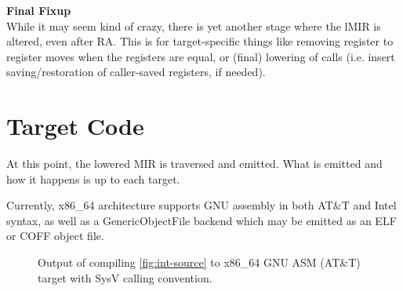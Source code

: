 \documentclass[12pt]{article}
\begin{document}
\noindent\textbf{Final Fixup}\\
\indent While it may seem kind of crazy, there is yet another stage where the lMIR is altered, even after RA. This is for target-specific things like removing register to register moves when the registers are equal, or (final) lowering of calls (i.e. insert saving/restoration of caller-saved registers, if needed).

\section{Target Code}
\label{sec:target-code}

At this point, the lowered MIR is traversed and emitted. What is emitted and how it happens is up to each target.

Currently, x86\_64 architecture supports GNU assembly in both AT\&T and Intel syntax, as well as a GenericObjectFile backend which may be emitted as an ELF or COFF object file.


\begin{figure}[h]
  \centering
  \caption{Output of compiling \autoref{fig:int-source} to x86\_64 GNU ASM (AT\&T) target with SysV calling convention.}
  \label{fig:int-gnu-asm-att}
\end{figure}
\FloatBarrier
\end{document}
